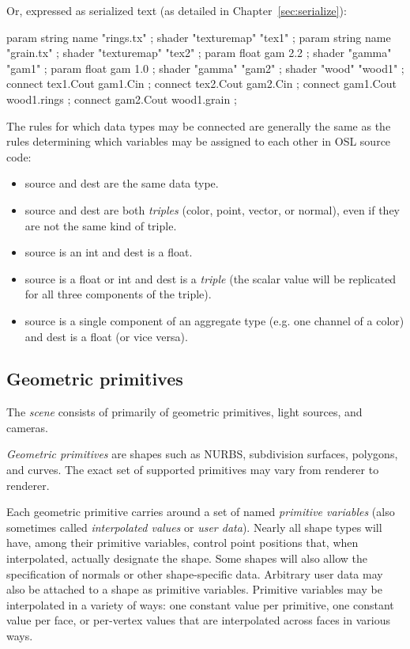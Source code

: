 \documentclass[11pt,letterpaper]{book}
\def\color{{\cf color}\xspace}
\def\normal{{\cf normal}\xspace}
\def\point{{\cf point}\xspace}
\def\vector{{\cf vector}\xspace}
\begin{document}
\noindent Or, expressed as serialized text (as detailed in
Chapter~\ref{sec:serialize}):

\begin{code}
    param string name "rings.tx" ;
    shader "texturemap" "tex1" ;
    param string name "grain.tx" ;
    shader "texturemap" "tex2" ;
    param float gam 2.2 ;
    shader "gamma" "gam1" ;
    param float gam 1.0 ;
    shader "gamma" "gam2" ;
    shader "wood" "wood1" ;
    connect tex1.Cout gam1.Cin ;
    connect tex2.Cout gam2.Cin ;
    connect gam1.Cout wood1.rings ;
    connect gam2.Cout wood1.grain ;
\end{code}

The rules for which data types may be connected are generally the same as
the rules determining which variables may be assigned to each other in OSL
source code:
\begin{itemize}
\item {\cf source} and {\cf dest} are the same data type.
\item {\cf source} and {\cf dest} are both \emph{triples} (\color, \point,
\vector, or \normal), even if they are not the same kind of triple.
\item {\cf source} is an {\cf int} and {\cf dest} is a {\cf float}.
\item {\cf source} is a {\cf float} or {\cf int} and {\cf dest} is a
\emph{triple} (the scalar value will be replicated for all three components
of the triple).
\item {\cf source} is a single component of an aggregate type (e.g. one
channel of a {\cf color}) and {\cf dest} is a {\cf float} (or vice versa).
\end{itemize}

\subsection*{Geometric primitives}

The \emph{scene} consists of primarily of geometric primitives,
light sources, and cameras.

\emph{Geometric primitives} are shapes such as NURBS, subdivision surfaces,
polygons, and curves.  The exact set of supported primitives may vary
from renderer to renderer.

Each geometric primitive carries around a set of named \emph{primitive
variables} (also sometimes called \emph{interpolated values} or
\emph{user data}).  Nearly all shape types will have, among their primitive
variables, control point positions that, when interpolated, actually
designate the shape.  Some shapes will also allow the specification of
normals or other shape-specific data.  Arbitrary user data may also be
attached to a shape as primitive variables.  Primitive variables may be
interpolated in a variety of ways: one constant value per primitive, one
constant value per face, or per-vertex values that are interpolated
across faces in various ways.
\end{document}
